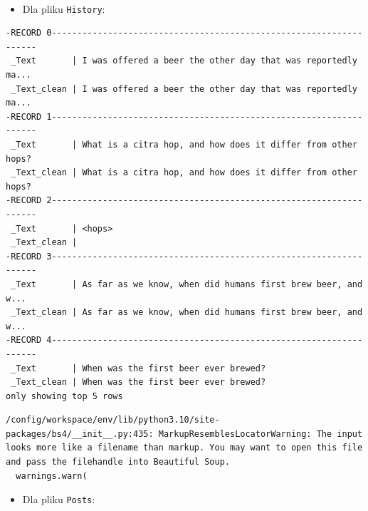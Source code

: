 \documentclass[
  letterpaper,
  DIV=11,
  numbers=noendperiod]{scrreprt}
\providecommand{\tightlist}{%
  \setlength{\itemsep}{0pt}\setlength{\parskip}{0pt}}\usepackage{longtable,booktabs,array}
\begin{document}
\begin{verbatim}
                                                                                
\end{verbatim}

\normalsize

\begin{itemize}
\tightlist
\item
  Dla pliku \texttt{History}: \small
\end{itemize}

\begin{verbatim}
-RECORD 0-------------------------------------------------------------------
 _Text       | I was offered a beer the other day that was reportedly ma... 
 _Text_clean | I was offered a beer the other day that was reportedly ma... 
-RECORD 1-------------------------------------------------------------------
 _Text       | What is a citra hop, and how does it differ from other hops? 
 _Text_clean | What is a citra hop, and how does it differ from other hops? 
-RECORD 2-------------------------------------------------------------------
 _Text       | <hops>                                                       
 _Text_clean |                                                              
-RECORD 3-------------------------------------------------------------------
 _Text       | As far as we know, when did humans first brew beer, and w... 
 _Text_clean | As far as we know, when did humans first brew beer, and w... 
-RECORD 4-------------------------------------------------------------------
 _Text       | When was the first beer ever brewed?                         
 _Text_clean | When was the first beer ever brewed?                         
only showing top 5 rows
\end{verbatim}

\begin{verbatim}
/config/workspace/env/lib/python3.10/site-packages/bs4/__init__.py:435: MarkupResemblesLocatorWarning: The input looks more like a filename than markup. You may want to open this file and pass the filehandle into Beautiful Soup.
  warnings.warn(
\end{verbatim}

\normalsize

\begin{itemize}
\tightlist
\item
  Dla pliku \texttt{Posts}: \small
\end{itemize}
\end{document}
